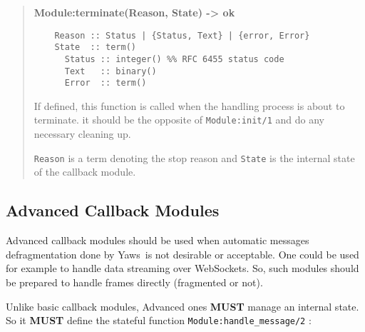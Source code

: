 \documentclass[11pt,oneside,english]{book}
\newcommand{\Yaws}            %
        {{\sc Yaws}}
\begin{document}
\begin{quote}
  \textbf{Module:terminate(Reason, State) -> ok}
\begin{verbatim}
    Reason :: Status | {Status, Text} | {error, Error}
    State  :: term()
      Status :: integer() %% RFC 6455 status code
      Text   :: binary()
      Error  :: term()
\end{verbatim}

  If defined, this function is called when the handling process is about to
  terminate. it should be the opposite of \verb+Module:init/1+ and do any
  necessary cleaning up.

  \verb+Reason+ is a term denoting the stop reason and \verb+State+ is the
  internal state of the callback module.
\end{quote}


\subsection{Advanced Callback Modules}

Advanced callback modules should be used when automatic messages defragmentation
done by \Yaws\ is not desirable or acceptable. One could be used for example to
handle data streaming over WebSockets. So, such modules should be prepared to
handle frames directly (fragmented or not).

Unlike basic callback modules, Advanced ones \textbf{MUST} manage an internal
state. So it \textbf{MUST} define the stateful function
\verb+Module:handle_message/2+ :
\end{document}
